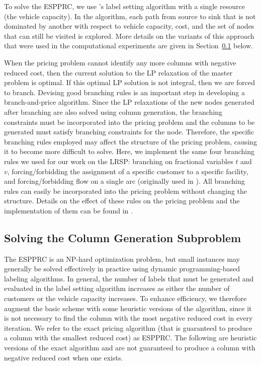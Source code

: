\documentclass[graybox]{./styles/svmult}
\begin{document}
To solve the ESPPRC, we use \citet{Feillet}'s label setting algorithm
with a single resource (the vehicle capacity). In the algorithm, each
path from source to sink that is not dominated by another with respect
to vehicle capacity, cost, and the set of nodes that can still be
visited is explored. More details on the variants of this approach
that were used in the computational experiments are given in
Section~\ref{sec:pricing} below.

When the pricing problem cannot identify any more columns with
negative reduced cost, then the current solution to the LP relaxation
of the master problem is optimal. If this optimal LP solution is not
integral, then we are forced to branch. Devising good branching rules
is an important step in developing a branch-and-price algorithm. Since
the LP relaxations of the new nodes generated after branching are also
solved using column generation, the branching constraints must be
incorporated into the pricing problem and the columns to be generated
must satisfy branching constraints for the node. Therefore, the
specific branching rules employed may affect the structure of the
pricing problem, causing it to become more difficult to solve. Here,
we implement the same four branching rules we used for our work on the
LRSP: branching on fractional variables $t$ and $v$, forcing/forbidding the
assignment of a specific customer to a specific facility, and
forcing/forbidding flow on a single arc (originally used in
\citet{Desrochers4}). All branching rules
can easily be incorporated into the pricing problem without
changing the structure. Details on the effect of these rules on the
pricing problem and the implementation of them can be found in
\citet{Akca}.

\subsection{Solving the Column Generation Subproblem}
\label{sec:pricing}
The ESPPRC is an NP-hard optimization problem, but small
instances may generally be solved effectively in practice using
dynamic programming-based labeling algorithms. In general, the number
of labels that must be generated and evaluated in the label setting
algorithm increases as either the number of customers or the vehicle
capacity increases. To enhance efficiency, we therefore augment the
basic scheme with some heuristic versions of the algorithm, since it
is not necessary to find the column with the most negative reduced
cost in every iteration. We refer to the exact pricing algorithm (that is
guaranteed to produce a column with the smallest reduced cost) as ESPPRC.
The following are heuristic versions of the exact algorithm and are
not guaranteed to produce a column with negative reduced cost when one
exists.
\end{document}
